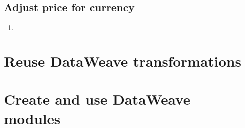 \subsection{Adjust price for currency}
\begin{enumerate}[resume*]
\item 
\end{enumerate}



\section{Reuse DataWeave transformations}



\section{Create and use DataWeave modules}

